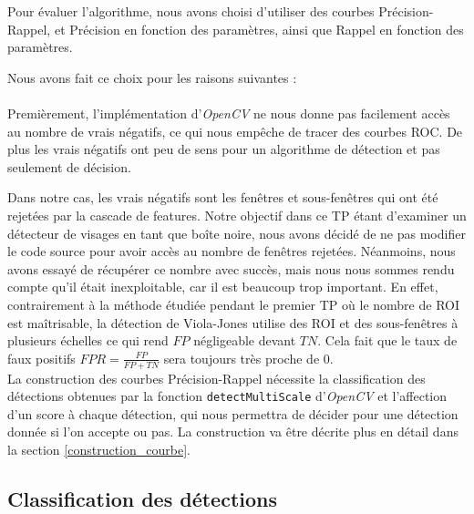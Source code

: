 \documentclass[a4paper,11pt]{article}
\begin{document}
        Pour évaluer l'algorithme, nous avons choisi d'utiliser des courbes Précision-Rappel, et Précision en fonction des paramètres, ainsi que Rappel en fonction des paramètres. 

        Nous avons fait ce choix pour les raisons suivantes :\\\\

        Premièrement, l'implémentation d'{\it OpenCV} ne nous donne pas facilement accès au nombre de vrais négatifs, ce qui nous empêche de tracer des courbes ROC. De plus les vrais négatifs ont peu de sens pour un algorithme de détection et pas seulement de décision.

        Dans notre cas, les vrais négatifs sont les fenêtres et sous-fenêtres qui ont été rejetées par la cascade de features.
        Notre objectif dans ce TP étant d'examiner un détecteur de visages en tant que boîte noire, nous avons décidé de ne pas modifier le code source pour avoir accès au nombre de fenêtres rejetées.
        Néanmoins, nous avons essayé de récupérer ce nombre avec succès, mais nous nous sommes rendu compte qu'il était inexploitable, car il est beaucoup trop important.
        En effet, contrairement à la méthode étudiée pendant le premier TP où le nombre de ROI est maîtrisable, la détection de Viola-Jones utilise des ROI et des sous-fenêtres à plusieurs échelles ce qui rend $FP$ négligeable devant $TN$.
        Cela fait que le taux de faux positifs $FPR = \frac{FP}{FP+TN}$ sera toujours très proche de $0$.
        \\
        La construction des courbes Précision-Rappel nécessite la classification des détections obtenues par la fonction \verb!detectMultiScale! d'{\it OpenCV} et l'affection d'un score à chaque détection, qui nous permettra de décider pour une détection donnée si l'on accepte ou pas. La construction va être décrite plus en détail dans la section  \ref{construction_courbe}.
        
    \subsection{Classification des détections}
        
\end{document}
